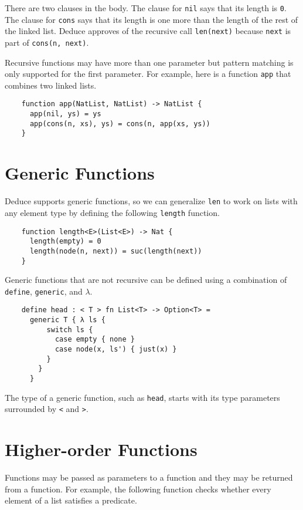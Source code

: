 \documentclass[12pt]{article}
\begin{document}
There are two clauses in the body. The clause for \texttt{nil} says
that its length is \texttt{0}.  The clause for \texttt{cons} says that
its length is one more than the length of the rest of the linked list.
Deduce approves of the recursive call \texttt{len(next)} because
\texttt{next} is part of \texttt{cons(n, next)}.

Recursive functions may have more than one parameter but pattern
matching is only supported for the first parameter. For example, here
is a function \texttt{app} that combines two linked lists.

\begin{verbatim}
    function app(NatList, NatList) -> NatList {
      app(nil, ys) = ys
      app(cons(n, xs), ys) = cons(n, app(xs, ys))
    }
\end{verbatim}

\section{Generic Functions}

Deduce supports generic functions, so we can generalize \texttt{len}
to work on lists with any element type by defining the following
\texttt{length} function.

\begin{verbatim}
    function length<E>(List<E>) -> Nat {
      length(empty) = 0
      length(node(n, next)) = suc(length(next))
    }
\end{verbatim}

Generic functions that are not recursive can be defined using a
combination of \texttt{define}, \texttt{generic}, and $\lambda$.

\begin{verbatim}
    define head : < T > fn List<T> -> Option<T> =
      generic T { λ ls { 
          switch ls {
            case empty { none }
            case node(x, ls') { just(x) }
          }
        }
      }
\end{verbatim}

\noindent The type of a generic function, such as \texttt{head},
starts with its type parameters surrounded by \texttt{<} and \texttt{>}.

\section{Higher-order Functions}

Functions may be passed as parameters to a function and they may be
returned from a function. For example, the following function checks
whether every element of a list satisfies a predicate.
\end{document}
